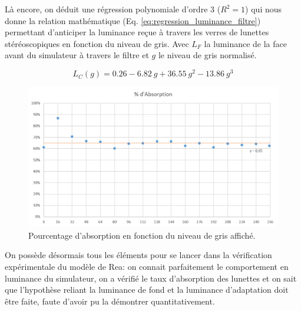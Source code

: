 	\par Là encore, on déduit une régression polynomiale d'ordre 3 ($R^2 = 1$) qui nous donne la relation mathématique (Eq. \ref{eq:regression_luminance_filtre}) permettant d'anticiper la luminance reçue à travers les verres de lunettes stéréoscopiques en fonction du niveau de gris. Avec $L_F$ la luminance de la face avant du simulateur à travers le filtre et $g$ le niveau de gris normalisé.
	
	\begin{equation}
		L_C(g) = 0.26 - 6.82~g + 36.55~g^2 - 13.86~g^3
		\label{eq:regression_luminance_filtre}
	\end{equation}
	
	\begin{figure}
		\centering
		\includegraphics[scale=.75]{Figures/PourcentageAbsorption}
		\caption{Pourcentage d'absorption en fonction du niveau de gris affiché.}
		\label{fig:pourcentage absorption}
	\end{figure}
	
	\par On possède désormais tous les éléments pour se lancer dans la vérification expérimentale du modèle de Rea: on connait parfaitement le comportement en luminance du simulateur, on a vérifié le taux d'absorption des lunettes et on sait que l'hypothèse reliant la luminance de fond et la luminance d'adaptation doit être faite, faute d'avoir pu la démontrer quantitativement.
